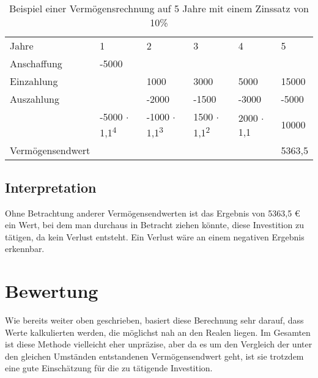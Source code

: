 \begin{table}[!h]
    \begin{tabular}{llllll}
        \cline{1-6} \rowcolor{gray}
        Jahre            & 1                                    & 2                                    & 3                                   & 4                & 5      \\ \cline{1-6} \rowcolor{white}
        Anschaffung      & -5000                                &                                      &                                     &                  &        \\ \cline{1-6} \rowcolor{white}
        Einzahlung       &                                      & 1000                                 & 3000                                & 5000             & 15000  \\ \cline{1-6} \rowcolor{white}
        Auszahlung       &                                      & -2000                                & -1500                               & -3000            & -5000  \\ \cline{1-6} \rowcolor{white}
        & -5000 $\cdot$ 1,1\textsuperscript{4} & -1000 $\cdot$ 1,1\textsuperscript{3} & 1500 $\cdot$ 1,1\textsuperscript{2} & 2000 $\cdot$ 1,1 & 10000  \\ \rowcolor{white}
        Vermögensendwert &                                      &                                      &                                     &                  & 5363,5 \\ \cline{1-6}
    \end{tabular}
    \caption{Beispiel einer Vermögensrechnung auf 5 Jahre mit einem Zinssatz von 10\%}
    \label{tb:VermoegensendwertRechnung}
\end{table}

\subsection{Interpretation}

Ohne Betrachtung anderer Vermögensendwerten ist das Ergebnis von 5363,5 € ein Wert, bei dem man durchaus in Betracht ziehen könnte, diese Investition zu tätigen, da kein Verlust entsteht. Ein Verlust wäre an einem negativen Ergebnis erkennbar.

\section{Bewertung}

Wie bereits weiter oben geschrieben, basiert diese Berechnung sehr darauf, dass Werte kalkulierten werden, die möglichst nah an den Realen liegen. Im Gesamten ist diese Methode vielleicht eher unpräzise, aber da es um den Vergleich der unter den gleichen Umständen entstandenen Vermögensendwert geht, ist sie trotzdem eine gute Einschätzung für die zu tätigende Investition.
